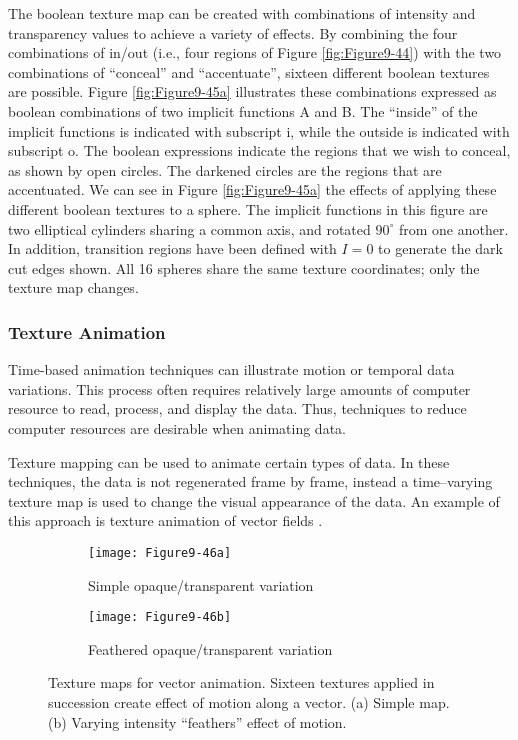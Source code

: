 The boolean texture map can be created with combinations of intensity and transparency values to achieve a variety of effects. By combining the four combinations of in/out (i.e., four regions of Figure \ref{fig:Figure9-44}) with the two combinations of ``conceal'' and ``accentuate'', sixteen different boolean textures are possible. Figure \ref{fig:Figure9-45a} illustrates these combinations expressed as boolean combinations of two implicit functions A and B. The ``inside'' of the implicit functions is indicated with subscript i, while the outside is indicated with subscript o. The boolean expressions indicate the regions that we wish to conceal, as shown by open circles. The darkened circles are the regions that are accentuated. We can see in Figure \ref{fig:Figure9-45a} the effects of applying these different boolean textures to a sphere. The implicit functions in this figure are two elliptical cylinders sharing a common axis, and rotated $90^\circ$ from one another. In addition, transition regions have been defined with $I = 0$ to generate the dark cut edges shown. All 16 spheres share the same texture coordinates; only the texture map changes.

\subsubsection{Texture Animation}

Time-based animation techniques can illustrate motion or temporal data variations. This process often requires relatively large amounts of computer resource to read, process, and display the data. Thus, techniques to reduce computer resources are desirable when animating data.

Texture mapping can be used to animate certain types of data. In these techniques, the data is not regenerated frame by frame, instead a time--varying texture map is used to change the visual appearance of the data. An example of this approach is texture animation of vector fields \cite{Yamrom95}.

\begin{figure}[htb]
	\begin{subfigure}[h]{0.32\linewidth}
		\texttt{[image: Figure9-46a]}
		\captionsetup{justification=centering}
		\caption{Simple opaque/transparent variation}
		\label{fig:Figure9-46a}
	\end{subfigure}
	\hfill
	\begin{subfigure}[h]{0.64\linewidth}
		\texttt{[image: Figure9-46b]}
		\captionsetup{justification=centering}
		\caption{Feathered opaque/transparent variation}
		\label{fig:Figure9-46b}
	\end{subfigure}
	\caption{Texture maps for vector animation. Sixteen textures applied in succession create effect of motion along a vector. (a) Simple map. (b) Varying intensity ``feathers'' effect of motion.}\label{fig:Figure9-46}
\end{figure}

